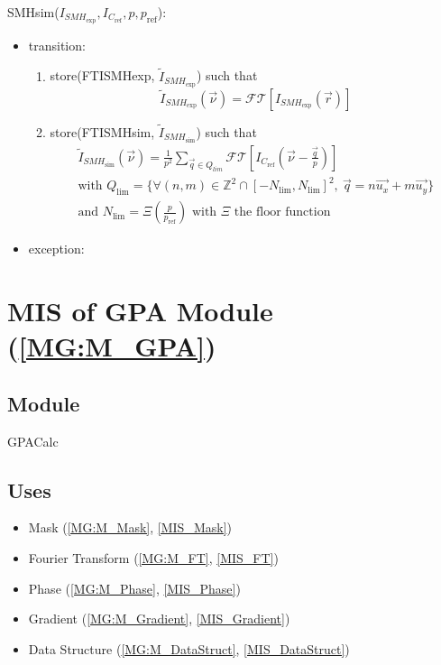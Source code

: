 \documentclass[12pt, titlepage]{article}
\begin{document}
\noindent SMHsim($I_{\mathit{SMH}_{\text{exp}}},I_{C_{\text{ref}}}, p, p_{\text{ref}}$):
\begin{itemize} 
\item transition:
	\begin{enumerate}
	\item store(FTISMHexp, $\widetilde{I}_{\mathit{SMH}_{\text{exp}}}$) such that
	\begin{equation*}
	\widetilde{I}_{\mathit{SMH}_{\text{exp}}}(\vec{\nu})=\mathcal{FT}[I_{\mathit{SMH}_{\text{exp}}}(\vec{r})]
	\end{equation*}
	\item store(FTISMHsim, $\widetilde{I}_{\mathit{SMH}_{\text{sim}}}$) such that
	\begin{equation*}
	\begin{gathered}
	\widetilde{I}_{\mathit{SMH}_{\text{sim}}}(\vec{\nu})=\frac{1}{p^2}\sum_{\vec{q}\in Q_{lim}}\mathcal{FT}[I_{C_{\text{ref}}}(\vec{\nu}-\frac{\vec{q}}{p})] \\
	\text{with } Q_{\text{lim}}=\{\forall (n,m) \in \mathbb{Z}^{2}\cap[-N_{\text{lim}},N_{\text{lim}}]^2, \ \vec{q}=n\vec{u_x}+m\vec{u_y}\} \\
	\text{and } N_{\text{lim}}=\Xi(\frac{p}{p_{\text{ref}}}) \text{ with } \Xi \text{ the floor function } 
	\end{gathered}
	\end{equation*}
	\end{enumerate}

\item exception:
\end{itemize}

\section{MIS of GPA Module (\texorpdfstring{\cref{MG:M_GPA}}))} \label{MIS_GPA}

\subsection{Module}
GPACalc
\subsection{Uses}
\begin{itemize}
\item Mask (\cref{MG:M_Mask}, \cref{MIS_Mask})
\item Fourier Transform (\cref{MG:M_FT}, \cref{MIS_FT})
\item Phase (\cref{MG:M_Phase}, \cref{MIS_Phase})
\item Gradient (\cref{MG:M_Gradient}, \cref{MIS_Gradient})
\item Data Structure (\cref{MG:M_DataStruct}, \cref{MIS_DataStruct})
\end{itemize}
\end{document}
